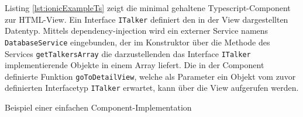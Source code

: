 Listing \ref{lst:ionicExampleTs} zeigt die minimal gehaltene Typescript-Component zur HTML-View. Ein Interface \texttt{ITalker} definiert den in der View dargestellten Datentyp. Mittels dependency-injection wird ein externer Service namens \texttt{DatabaseService} eingebunden, der im Konstruktor über die Methode des Services \texttt{getTalkersArray} die darzustellenden das Interface \texttt{ITalker} implementierende Objekte in einem Array liefert. Die in der Component definierte Funktion \texttt{goToDetailView}, welche als Parameter ein Objekt vom zuvor definierten Interfacetyp \texttt{ITalker} erwartet, kann über die View aufgerufen werden.

\begin{listing}[htb]
    
    \caption{Beispiel einer einfachen Component-Implementation}
    \label{lst:ionicExampleTs}
\end{listing}

